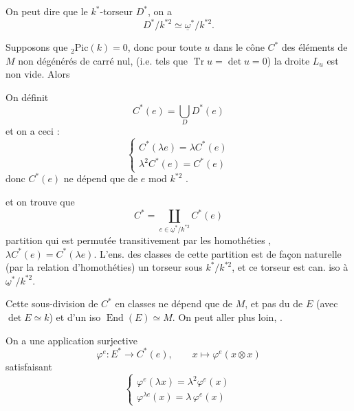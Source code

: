 \documentclass[11pt,a4paper]{article}
\begin{document}
On peut dire que   le $k^*$-torseur $D^*$, on a
\[
  D^*/k^{*2} \simeq \underline{\omega}^*/k^{*2} .
\]

\struck{\ill{}} Supposons que ${}_2\mathrm{Pic}(k) = 0$, donc pour toute  $u$ dans le cône $C^*$ des éléments de $M$ non dégénérés de carré nul, (i.e. tels que $\operatorname{Tr} u = \det u = 0$) la droite $L_u$ est non vide. Alors

On définit 
\[
  C^*(e) = \bigcup_{D} D^*(e)
\]
et on a ceci :
\[
  \left\{
  \begin{array}{l}
    C^*(\lambda e) = \lambda C^*(e) \\
    \lambda^2 C^*(e) = C^*(e)
  \end{array}
  \right.
\]
donc $C^*(e)$ ne dépend que de $e$ mod $k^{*2}$ \struck{\ill{}}.

et on trouve que
\[
  C^* = \coprod_{e\in\underline{\omega}^*/k^{*2}} C^*(e)
\]
partition qui est permutée transitivement par les homothéties ,   $\lambda C^*(e) = C^*(\lambda e)$. L'ens. des classes de cette partition est  de façon naturelle (par la relation d'homothéties) un torseur sous $k^*/k^{*2}$, et ce torseur est can. iso à $\underline{\omega}^*/k^{*2}$.

Cette sous-division de $C^*$ en classes ne dépend que de $M$, et pas du  de $E$ (avec $\det E\simeq k$) et d'un iso $\operatorname{End}(E)\simeq M$. On peut aller plus loin, .

On \struck{\ill{}} a une application surjective
\[
  \varphi^e : E^* \longrightarrow C^*(e), \qquad x\longmapsto \varphi^e(x\otimes x)
\]
satisfaisant
\[
  \left\{
  \begin{array}{l}
    \varphi^e(\lambda x) = \lambda^2 \varphi^e(x) \\
    \varphi^{\lambda e}(x) = \lambda\, \varphi^e(x)
  \end{array}
  \right.
\]

\end{document}
